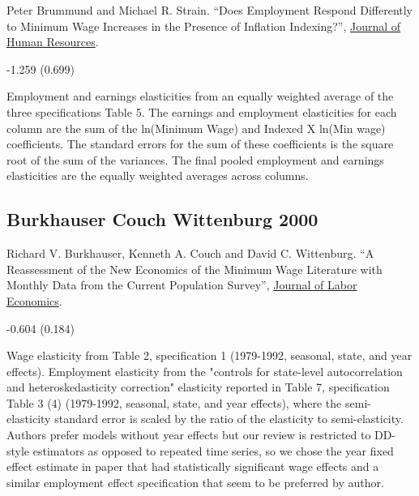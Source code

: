 \noindent Peter Brummund and Michael R. Strain. ``Does Employment Respond Differently to Minimum Wage Increases in the Presence of Inflation Indexing?'', \href{https://doi.org/10.3368/jhr.55.2.1216.8404R2}{Journal of Human Resources}.

\vspace{0.7em}

 -1.259 (0.699)

\vspace{0.7em}

 Employment and earnings elasticities from an equally weighted average of the three specifications Table 5. The earnings and employment elasticities for each column are the sum of the ln(Minimum Wage) and Indexed X ln(Min wage) coefficients. The standard errors for the sum of these coefficients is the square root of the sum of the variances. The final pooled employment and earnings elasticities are the equally weighted averages across columns.

\subsection*{Burkhauser Couch Wittenburg 2000}
\vspace{-0.7em}

\noindent Richard V. Burkhauser, Kenneth A. Couch and David C. Wittenburg. ``A Reassessment of the New Economics of the Minimum Wage Literature with Monthly Data from the Current Population Survey'', \href{https://doi.org/10.1086/209972}{Journal of Labor Economics}.

\vspace{0.7em}

 -0.604 (0.184)

\vspace{0.7em}

 Wage elasticity from Table 2, specification 1 (1979-1992, seasonal, state, and year effects). Employment elasticity from the "controls for state-level autocorrelation and heteroskedasticity correction" elasticity reported in Table 7, specification Table 3 (4) (1979-1992, seasonal, state, and year effects), where the semi-elasticity standard error is scaled by the ratio of the elasticity to semi-elasticity. Authors prefer models without year effects but our review is restricted to DD-style estimators as opposed to repeated time series, so we chose the year fixed effect estimate in paper that had statistically significant wage effects and a similar employment effect specification that seem to be preferred by author.

